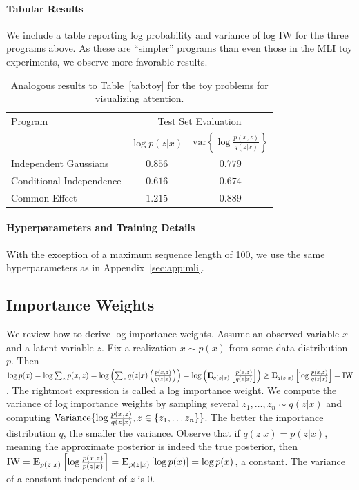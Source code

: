 \paragraph{Tabular Results} We include a table reporting log probability and variance of log IW for the three programs above. As these are ``simpler'' programs than even those in the MLI toy experiments, we observe more favorable results.

\begin{table}[h!]
\centering
\begin{tabular}{lcc}
\toprule
Program & \multicolumn{2}{c}{Test Set Evaluation} \\
& $\log p(z|x)$ & $\text{var}\left\{\log \frac{p(x,z)}{q(z|x)}\right\}$ \\
\midrule
Independent Gaussians & $0.856$ & $0.779$ \\
Conditional Independence & $0.616$ & $0.674$ \\
Common Effect & $1.215$ & $0.889$ \\
\bottomrule
\end{tabular}
\caption{Analogous results to Table~\ref{tab:toy} for the toy problems for visualizing attention.}
\label{tab:toy:viz}
\end{table}

\paragraph{Hyperparameters and Training Details} With the exception of a maximum sequence length of 100, we use the same hyperparameters as in Appendix~\ref{sec:app:mli}.

\subsection{Importance Weights}
We review how to derive log importance weights. Assume an observed variable $x$ and a latent variable $z$. Fix a realization $x \sim p(x)$ from some data distribution $p$. Then $\log p(x) = \log \sum_z p(x,z) = \log \left( \sum_z q(z|x) \left(\frac{p(x,z)}{q(z|x)}\right)\right) = \log \left( \mathbf{E}_{q(z|x)}\left[\frac{p(x,z)}{q(z|x)}\right] \right) \geq \mathbf{E}_{q(z|x)}\left[ \log \frac{p(x,z)}{q(z|x)} \right] = \textup{IW}$. The rightmost expression is called a log importance weight. We compute the variance of log importance weights by sampling several $z_1, \ldots, z_n \sim q(z|x)$ and computing $\textup{Variance}\{ \log\frac{p(x,z)}{q(z|x)}, z \in \{z_1, \ldots z_n\} \}$. The better the importance distribution $q$, the smaller the variance. Observe that if $q(z|x) = p(z|x)$, meaning the approximate posterior is indeed the true posterior, then $\textup{IW} = \mathbf{E}_{p(z|x)}\left[ \log \frac{p(x,z)}{p(z|x)} \right] = \mathbf{E}_{p(z|x)}\left[ \log p(x) \right] = \log p(x)$, a constant. The variance of a constant independent of $z$ is 0.

